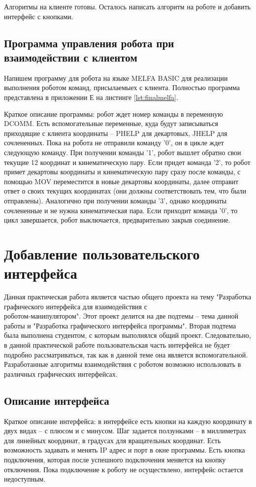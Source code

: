 \documentclass[a4paper,14pt]{extarticle}
\begin{document}
Алгоритмы на клиенте готовы. Осталось написать алгоритм на роботе
и добавить интерфейс с кнопками.


\subsection{Программа управления робота при взаимодействии с клиентом}
Напишем программу для робота на языке MELFA BASIC для реализации
выполнения роботом команд, присылаемыех с клиента. Полностью программа
представлена в приложении Е на листинге \ref{lst:finalmelfa}.


Краткое описание программы: робот ждет номер команды в переменную DCOMM.
Есть вспомогательные переменные, куда будут записываться приходящие с клиента
координаты -- PHELP для декартовых, JHELP для сочлененных. Пока на робота не отправили
команду '0', он в цикле ждет следующую команду. При получении команды '1', робот
вышлет обратно свои текущие 12 координат и кинематическую пару. Если придет команда '2',
то робот примет декартовы координаты и кинематическую пару сразу после команды, с помощью MOV переместится
в новые декартовы координаты, далее отправит ответ о своих текущих координатах (они должны
соответствовать тем, что были отправлены). Аналогично при получении команды '3', однако
координаты сочлененные и не нужна кинематическая пара. Если приходит команда '0', то
цикл завершается, робот выключается, предварительно закрыв соединение.


\section{Добавление пользовательского интерфейса}
Данная практическая работа является частью общего проекта
на тему "Разработка графического интерфейса для взаимодействия с\\ роботом-манипулятором".
Этот проект делится на две подтемы -- тема данной работы и "Разработка графического интерфейса программы".
Вторая подтема была выполнена студентом, с которым выполнялся общий проект.
Следовательно, в данной практической работе пользовательская часть интерфейса
не будет подробно рассматриваться, так как в данной теме она является вспомогательной.
Разработанные алгоритмы взаимодействия с роботом возможно использовать в различных
графических интерфейсах.


\subsection{Описание интерфейса}
Краткое описание интерфейса: в интерфейсе
есть кнопки на каждую координату в двух видах -- с плюсом и с минусом.
Шаг задается ползунками -- в миллиметрах для линейных координат, в градусах для вращательных координат.
Есть возможность задавать и менять IP адрес и порт в окне программы. Есть кнопка подключения,
которая после успешного подключения меняется на кнопку отключения. Пока подключение к роботу
не осуществлено, интерфейс остается недоступным.
\end{document}
